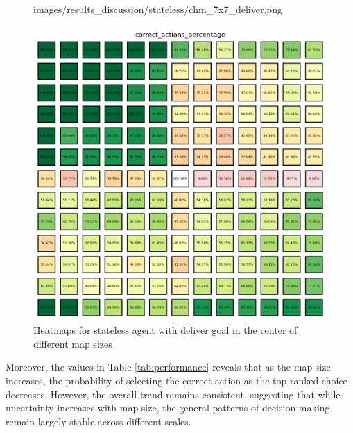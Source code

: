 \begin{figure}[h!]
\begin{minipage}[b]{0.32\textwidth}
{      images/results_discussion/stateless/chm_7x7_deliver.png
    }
    \caption{$7 \times 7$}
    \label{fig:chm_7x7_deliver}
  \end{minipage}
  \hfill
  \begin{minipage}[b]{0.32\textwidth}
    \centering
    \includegraphics[width=\textwidth]{
      images/results_discussion/stateless/chm_13x13_deliver.png
    }
    \caption{$13 \times 13$}
    \label{fig:chm_13x13_deliver}
  \end{minipage}
  \caption{Heatmaps for stateless agent with deliver goal in the center of
  different map sizes}
  \label{fig:stateless_deliver_correctness}
\end{figure}
\vspace{5mm}

Moreover, the values in Table \ref{tab:performance} reveals that as the map size
increases, the probability of selecting the correct action as the top-ranked
choice decreases. However, the overall trend remains consistent, suggesting that
while uncertainty increases with map size, the general patterns of decision-making
remain largely stable across different scales.

